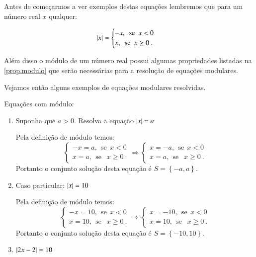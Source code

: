  Antes de começarmos a ver exemplos destas equações lembremos que para um número real $x$ qualquer:

 \[
\left|x\right|= \begin{cases}
      -x, \ \ \text{se} \ \ x<0 \\
      x, \ \ \text{se} \ \ x \geq 0 \ .
     \end{cases}
\]

Além disso o módulo de um número real possui algumas propriedades listadas na \autoref{prop.modulo} que serão necessárias para a resolução de equações modulares.

Vejamos então alguns exemplos de equações modulares resolvidas.

\begin{exem} Equações com módulo:
 \begin{enumerate}
  \item Suponha que $a> 0$. Resolva a equação $\left|x\right|= a$

  Pela definição de módulo temos:
  \[
  \begin{cases}
      -x= a, \ \ \text{se} \ \ x<0 \\
      x= a, \ \ \text{se } \ \ x \geq 0 \ .
     \end{cases}
     \Rightarrow
     \begin{cases}
      x= -a, \ \ \text{se} \ \ x<0 \\
      x= a, \ \ \text{se } \ \ x \geq 0 \ .
     \end{cases}
  \]
 Portanto o conjunto solução desta equação é $S= \left\{-a, a \right\}$.

  \item Caso particular: $\left|x\right|= 10$

  Pela definição de módulo temos:
  \[
  \begin{cases}
      -x= 10, \ \ \text{se} \ \ x<0 \\
      x= 10, \ \ \text{se } \ \ x \geq 0 \ .
     \end{cases}
     \Rightarrow
     \begin{cases}
      x= -10, \ \ \text{se} \ \ x<0 \\
      x= 10, \ \ \text{se } \ \ x \geq 0 \ .
     \end{cases}
  \]
 Portanto o conjunto solução desta equação é $S= \left\{-10, 10 \right\}$.

 \item $\left|2x-2\right|= 10$


\end{enumerate}
\end{exem}
